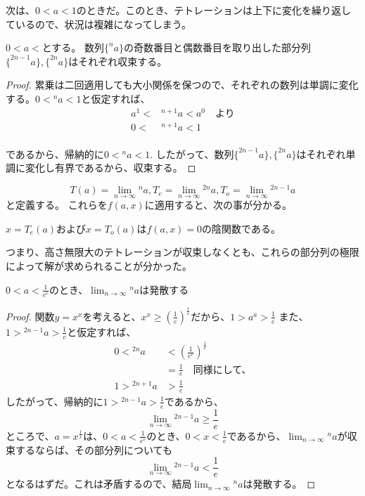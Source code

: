 	次は、$0 < a < 1$のときだ。このとき、テトレーションは上下に変化を繰り返しているので、状況は複雑になってしまう。
	\begin{lemma}
		$0 < a < $とする。
		数列$\{^n a\}$の奇数番目と偶数番目を取り出した部分列$\{^{2n-1} a\},\{^{2n} a\}$はそれぞれ収束する。
	\end{lemma}
	\begin{proof}
	
		累乗は二回適用しても大小関係を保つので、それぞれの数列は単調に変化する。$0 < {^n a} < 1$と仮定すれば、
		\begin{align*}
			a^1<&{^{n+1} a}<a^0 \quad \text{より}\\
			0<&{^{n+1} a}<1 \\
		\end{align*}
		
		であるから、帰納的に$0 < {^n a} < 1$.
		したがって、数列$\{^{2n-1} a\},\{^{2n} a\}$はそれぞれ単調に変化し有界であるから、収束する。
	\end{proof}

	\[
		T(a) = \lim_{n \to \infty} {^n a},
		T_e = \lim_{n \to \infty} {^{2n} a},
		T_o = \lim_{n \to \infty} {^{2n - 1} a}
	\]と定義する。
	これらを$f(a,x)$に適用すると、次の事が分かる。
	\begin{theorem}
	\label{th:tetration_implicit_function}
		$x = T_e(a)$および$x = T_o(a)$は$f(a,x)=0$の陰関数である。
	\end{theorem}
	つまり、高さ無限大のテトレーションが収束しなくとも、これらの部分列の極限によって解が求められることが分かった。
	
	\begin{theorem}
		$0 < a < \frac{1}{e^e}$のとき、$\displaystyle \lim_{n \to \infty} {^n a}$は発散する
	\end{theorem}
	\begin{proof}
		
		関数$y = x^x$を考えると、$x^x \geq (\frac{1}{e})^{\frac{1}{e}}$だから、$1 > a^a > \frac{1}{e}$
		また、$1 > {^{2n-1} a} > \frac{1}{e}$と仮定すれば、
		\begin{align*}
			0 < {^{2n} a} &< (\frac{1}{e^e})^{\frac{1}{e}} \\
						  &= \frac{1}{e} \quad \text{同様にして、} \\
			1 > {^{2n+1} a} &> \frac{1}{e}
		\end{align*}
		したがって、帰納的に$1 > {^{2n-1} a} > \frac{1}{e}$であるから、
		\begin{equation*}
			\lim_{n \to \infty} {^{2n - 1} a} \geq \frac{1}{e}
		\end{equation*}
		ところで、$a = x^{\frac{1}{x}}$は、$0 < a < \frac{1}{e^e}$のとき、$0 < x < \frac{1}{e}$であるから、$\displaystyle \lim_{n \to \infty} {^n a}$が収束するならば、その部分列についても
		\begin{equation*}
			\lim_{n \to \infty} {^{2n - 1} a} < \frac{1}{e}
		\end{equation*}
		となるはずだ。これは矛盾するので、結局$\displaystyle \lim_{n \to \infty} {^n a}$は発散する。
	\end{proof}
	
